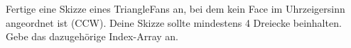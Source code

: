 \documentclass[../../main.tex]{subfiles}
\begin{document}
Fertige eine Skizze eines TriangleFans an, bei dem kein Face im Uhrzeigersinn angeordnet ist (CCW). Deine Skizze sollte mindestens 4 Dreiecke beinhalten. Gebe das dazugehörige Index-Array an.
\end{document}
